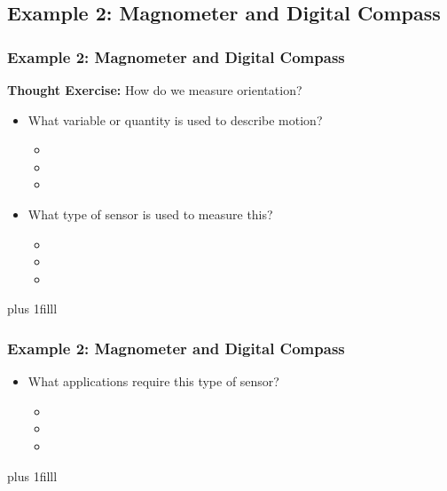 \documentclass[fleqn]{beamer} %
\newcommand{\sectionIIsubsectionIVtitle}{Example 2: Magnometer and Digital Compass}
\newcommand{\btVFill}{\vskip0pt plus 1filll}
\begin{document}
		\subsection{\sectionIIsubsectionIVtitle}\label{sectionIIsubsectionIV}

			\begin{frame}
				\frametitle{\sectionIIsubsectionIVtitle}

					{\bf Thought Exercise:} How do we measure {\BL orientation}?        
	
					\begin{itemize}
					
						\item What variable or quantity is used to describe motion?                         
						\begin{itemize}
							\item
							\item
							\item	
						\end{itemize} \vspace{5mm}
						\item What type of sensor is used to measure this?
						\begin{itemize}
							\item
							\item
							\item	
						\end{itemize}	

					\end{itemize}
				
				\btVFill


			\end{frame}

			\begin{frame}
				\frametitle{\sectionIIsubsectionIVtitle}

				\begin{itemize}
					\item What applications require this type of sensor?
					\begin{itemize}
						\item \vspace{5mm}
						\item \vspace{5mm}
						\item \vspace{5mm}	
					\end{itemize}
				\end{itemize}

				\btVFill	

			\end{frame}
\end{document}
